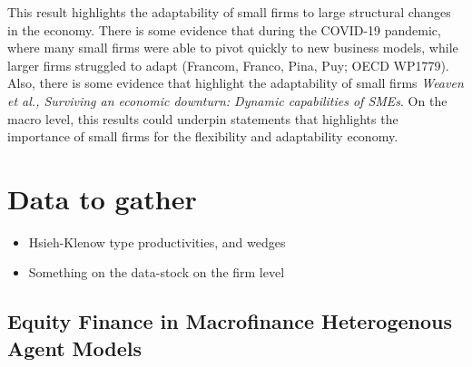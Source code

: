 \documentclass[12pt]{article}
\begin{document}
This result highlights the adaptability of small firms to large structural changes in the economy. There is some evidence that during the COVID-19 pandemic, where many small firms were able to pivot quickly to new business models, while larger firms struggled to adapt (Francom, Franco, Pina, Puy; OECD WP1779). Also, there is some evidence that highlight the adaptability of small firms \textit{Weaven et al., Surviving an economic downturn: Dynamic capabilities of SMEs}. On the macro level, this results could underpin statements that highlights the importance of small firms for the flexibility and adaptability economy.


\section*{Data to gather}

\begin{itemize} \setlength\itemsep{0em}
	\item Hsieh-Klenow type productivities, and wedges 
	\item Something on the data-stock on the firm level
\end{itemize}


\subsection*{Equity Finance in Macrofinance Heterogenous Agent Models}
\end{document}
